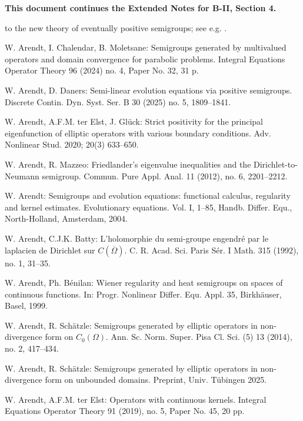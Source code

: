 \bigskip
\textbf{This document continues the Extended Notes for B-II, Section 4.}
\bigskip


to the new theory of eventually positive semigroups; see e.g. \cite{DEK16}.

\begin{thebibliography}{99}

 W. Arendt, I. Chalendar, B. Moletsane: Semigroups generated by multivalued operators and domain convergence for parabolic problems. Integral Equations Operator Theory 96 (2024) no. 4, Paper No. 32, 31 p.

 W. Arendt, D. Daners: Semi-linear evolution equations via positive semigroups. Discrete Contin. Dyn. Syst. Ser. B 30 (2025) no. 5, 1809--1841.

 W. Arendt, A.F.M. ter Elst, J. Glück: Strict positivity for the principal eigenfunction of elliptic operators with various boundary conditions. Adv. Nonlinear Stud. 2020; 20(3) 633--650.

 W. Arendt, R. Mazzeo: Friedlander's eigenvalue inequalities and the Dirichlet-to-Neumann semigroup. Commun. Pure Appl. Anal. 11 (2012), no. 6, 2201--2212.

 W. Arendt: Semigroups and evolution equations: functional calculus, regularity and kernel estimates. Evolutionary equations. Vol. I, 1--85, Handb. Differ. Equ., North-Holland, Amsterdam, 2004.

 W. Arendt, C.J.K. Batty: L'holomorphie du semi-groupe engendré par le laplacien de Dirichlet sur $C(\overline{\Omega})$. C. R. Acad. Sci. Paris Sér. I Math. 315 (1992), no. 1, 31--35.

 W. Arendt, Ph. Bénilan: Wiener regularity and heat semigroups on spaces of continuous functions. In: Progr. Nonlinear Differ. Equ. Appl. 35, Birkhäuser, Basel, 1999.

 W. Arendt, R. Schätzle: Semigroups generated by elliptic operators in non-divergence form on $C_0(\Omega)$. Ann. Sc. Norm. Super. Pisa Cl. Sci. (5) 13 (2014), no. 2, 417--434.

 W. Arendt, R. Schätzle: Semigroups generated by elliptic operators in non-divergence form on unbounded domains. Preprint, Univ. Tübingen 2025.

 W. Arendt, A.F.M. ter Elst: Operators with continuous kernels. Integral Equations Operator Theory 91 (2019), no. 5, Paper No. 45, 20 pp.


\end{thebibliography}
